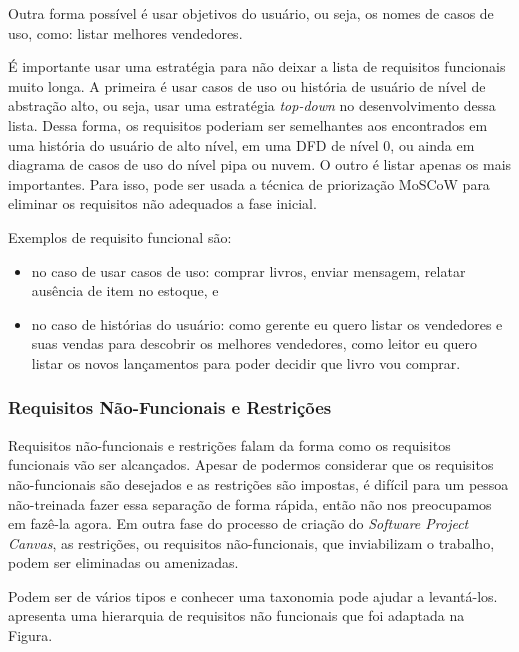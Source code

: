 \documentclass{article}
\begin{document}
Outra forma possível é usar objetivos do usuário, ou seja, os nomes de casos de uso, como: listar melhores vendedores\citep{Cockburn2000}.

É importante usar uma estratégia para não deixar a lista de requisitos funcionais muito longa. A primeira é usar casos de uso ou história de usuário de nível de abstração alto, ou seja, usar uma estratégia \textit{top-down} no desenvolvimento dessa lista. Dessa forma, os requisitos poderiam ser semelhantes aos encontrados em uma história do usuário de alto nível\citep{jacobson:2011:uc2p0}, em uma DFD de nível 0\citep{gane:sarson:ssa}, ou ainda em diagrama de casos de uso do nível pipa ou nuvem\citep{Cockburn2000}. O outro é listar apenas os mais importantes. Para isso, pode ser usada a técnica de priorização MoSCoW\citep{babok,dsdm:2nd} para eliminar os requisitos não adequados a fase inicial.

Exemplos de requisito funcional são:
\begin{itemize}
    \item no caso de usar casos de uso: comprar livros, enviar mensagem, relatar ausência de item no estoque, e
    \item no caso de histórias do usuário: como gerente eu quero listar os vendedores e suas vendas para descobrir os melhores vendedores, como leitor eu quero listar os novos lançamentos para poder decidir que livro vou comprar.
\end{itemize}

\subsubsection{Requisitos Não-Funcionais e Restrições}

Requisitos não-funcionais e restrições falam da forma como os requisitos funcionais vão ser alcançados. Apesar de podermos considerar que os requisitos não-funcionais são desejados e as restrições são impostas, é difícil para um pessoa não-treinada fazer essa separação de forma rápida, então não nos preocupamos em fazê-la agora. Em outra fase do processo de criação do \textit{Software Project Canvas}, as restrições, ou requisitos não-funcionais, que inviabilizam o trabalho, podem ser eliminadas ou amenizadas.

Podem ser de vários tipos e conhecer uma taxonomia pode ajudar a levantá-los. \citet{sommerville:software:2015} apresenta uma hierarquia de requisitos não funcionais que foi adaptada na Figura.
\end{document}
